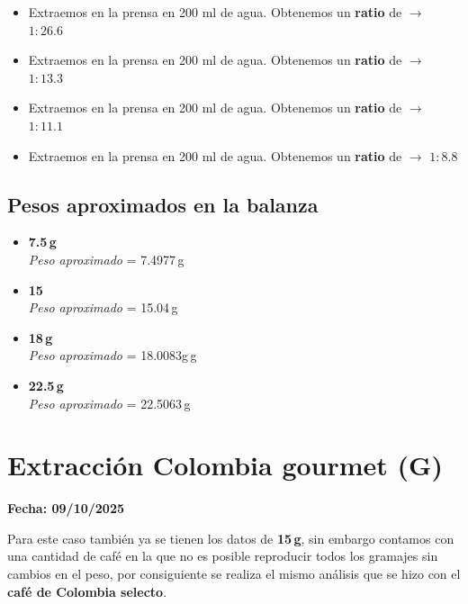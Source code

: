 \documentclass{article}
\begin{document}
\begin{itemize}
\item[$\bullet$] Extraemos en la prensa  en 200 ml de agua. Obtenemos un \textbf{ratio} de $\to$ $\boxed{ 1:26\text{.}6 }$
\item[$\bullet$] Extraemos en la prensa  en 200 ml de agua. Obtenemos un \textbf{ratio} de $\to$ $\boxed{ 1:13\text{.}3}$
\item[$\bullet$] Extraemos en la prensa  en 200 ml de agua. Obtenemos un \textbf{ratio} de $\to$ $\boxed{ 1:11\text{.}1}$
\item[$\bullet$] Extraemos en la prensa  en 200 ml de agua. Obtenemos un \textbf{ratio} de $\to$ $\boxed{ 1:8\text{.}8}$ 
\end{itemize}

\subsection{Pesos aproximados en la balanza}

\begin{itemize}
\item[$\bullet$] \textbf{7.5\,g}\\
\textit{Peso aproximado} = 7.4977\,g\\
\item[$\bullet$] \textbf{15\,}\\
\textit{Peso aproximado} = 15.04\,g\\
\item[$\bullet$] \textbf{18\,g}\\
\textit{Peso aproximado} = 18.0083g\,g \\
\item[$\bullet$] \textbf{22.5\,g}\\
\textit{Peso aproximado} = 22.5063\,g
\end{itemize}

\section{Extracción Colombia gourmet (G)}

\textbf{Fecha: 09/10/2025}

Para este caso también ya se tienen los datos de \textbf{15\,g}, sin embargo contamos con una cantidad de café en la que no es posible reproducir todos los gramajes sin cambios en el peso, por consiguiente se realiza el mismo análisis que se hizo con el \textbf{café de Colombia selecto}.
\end{document}
